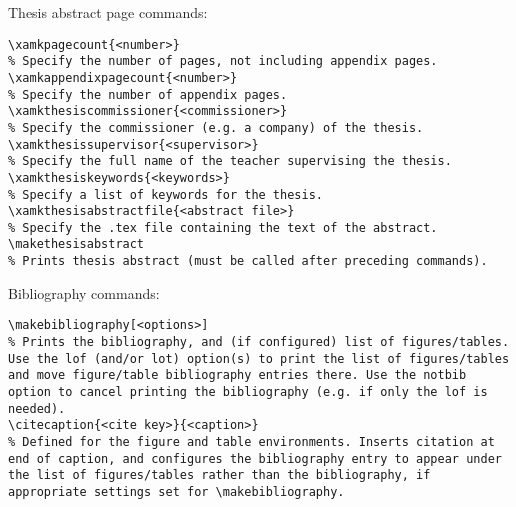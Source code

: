 %
Thesis abstract page commands:
\begin{verbatim}
\xamkpagecount{<number>}
% Specify the number of pages, not including appendix pages.
\xamkappendixpagecount{<number>}
% Specify the number of appendix pages.
\xamkthesiscommissioner{<commissioner>}
% Specify the commissioner (e.g. a company) of the thesis.
\xamkthesissupervisor{<supervisor>}
% Specify the full name of the teacher supervising the thesis.
\xamkthesiskeywords{<keywords>}
% Specify a list of keywords for the thesis.
\xamkthesisabstractfile{<abstract file>}
% Specify the .tex file containing the text of the abstract.
\makethesisabstract
% Prints thesis abstract (must be called after preceding commands).
\end{verbatim}

Bibliography commands:
\begin{verbatim}
\makebibliography[<options>]
% Prints the bibliography, and (if configured) list of figures/tables. Use the lof (and/or lot) option(s) to print the list of figures/tables and move figure/table bibliography entries there. Use the notbib option to cancel printing the bibliography (e.g. if only the lof is needed).
\citecaption{<cite key>}{<caption>}
% Defined for the figure and table environments. Inserts citation at end of caption, and configures the bibliography entry to appear under the list of figures/tables rather than the bibliography, if appropriate settings set for \makebibliography.
\end{verbatim}

\begin{comment}

\clearpage
\subsection{subsection 1}

\section{Test appendix 2}

\section{Test appendix 3}
\clearpage
\subsection{subsection 1}
\clearpage
\subsection{subsection 2}
\clearpage

\end{comment}
